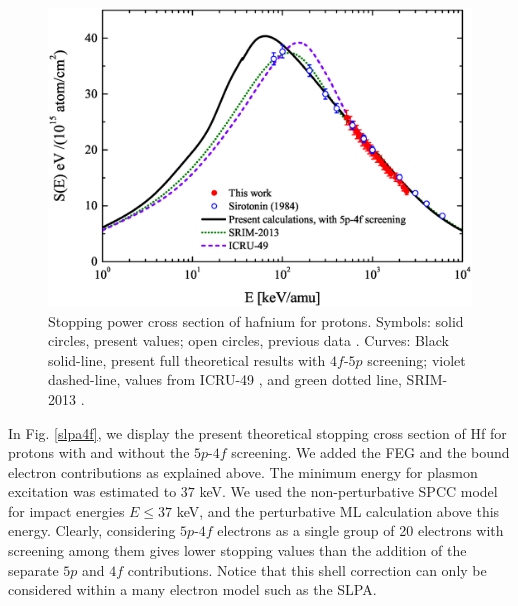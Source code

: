 \documentclass[aps,pra,reprint,groupedaddress]{revtex4-1}
\begin{document}
\begin{figure}[!t]
\centering
\includegraphics[width=13.0cm]{Fig03.eps}
\caption{Stopping power cross section of hafnium for protons. Symbols: solid circles, present values; open circles, previous data \cite{Sirotinin}. Curves: Black solid-line, present full theoretical results with $4f$-$5p$ screening; violet dashed-line, values from ICRU-49 \cite{ICRU49}, and green dotted line, SRIM-2013 \cite{Ziegler01}.}
\label{F03}
\end{figure}

In Fig. \ref{slpa4f}, we display the present theoretical stopping cross section of Hf for protons with and without the $5p$-$4f$ screening. We added the FEG and the bound electron contributions as explained above. The minimum energy for plasmon excitation was estimated to $37$ keV. We used the non-perturbative SPCC model for impact energies $E \leq 37$ keV, and the perturbative ML calculation above this energy. %
Clearly, considering $5p$-$4f$ electrons as a single group of 20 electrons with screening among them gives lower stopping values than the addition of the separate $5p$ and $4f$ contributions. Notice that this shell correction can only be considered within a many electron model such as the SLPA.
\end{document}

